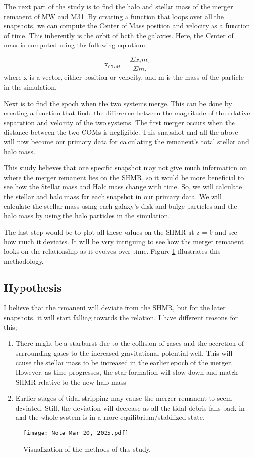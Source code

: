 \documentclass[twocolumn]{aastex631}
\begin{document}
The next part of the study is to find the halo and stellar mass of the merger remanent of MW and M31. By creating a function that loops over all the snapshots, we can compute the Center of Mass position and velocity as a function of time. This inherently is the orbit of both the galaxies. Here, the Center of mass is computed using the following equation:

\[\textbf{x}_{COM} = \frac{\Sigma x_im_i}{\Sigma m_i}\]
where x is a vector, either position or velocity, and m is the mass of the particle in the simulation.

Next is to find the epoch when the two systems merge. This can be done by creating a function that finds the difference between the magnitude of the relative separation and velocity of the two systems. The first merger occurs when the distance between the two COMs is negligible. This snapshot and all the above will now become our primary data for calculating the remanent's total stellar and halo mass.

This study believes that one specific snapshot may not give much information on where the merger remanent lies on the SHMR, so it would be more beneficial to see how the Stellar mass and Halo mass change with time. So, we will calculate the stellar and halo mass for each snapshot in our primary data. We will calculate the stellar mass using each galaxy's disk and bulge particles and the halo mass by using the halo particles in the simulation.

The last step would be to plot all these values on the SHMR at z = 0 and see how much it deviates. It will be very intriguing to see how the merger remanent looks on the relationship as it evolves over time. Figure \ref{Visualization} illustrates this methodology. 


\subsection{Hypothesis}
I believe that the remanent will deviate from the SHMR, but for the later snapshots, it will start falling towards the relation. I have different reasons for this;
\begin{enumerate}
    \item There might be a starburst due to the collision of gases and the accretion of surrounding gases to the increased gravitational potential well. This will cause the stellar mass to be increased in the earlier epoch of the merger. However, as time progresses, the star formation will slow down and match SHMR relative to the new halo mass.
    \item Earlier stages of tidal stripping may cause the merger remanent to seem deviated. Still, the deviation will decrease as all the tidal debris falls back in and the whole system is in a more equilibrium/stabilized state.
\end{enumerate}
\begin{figure}
    \centering
    \texttt{[image: Note Mar 20, 2025.pdf]}
    \caption{Visualization of the methods of this study.}
    \label{Visualization}
\end{figure}


{}

\end{document}
